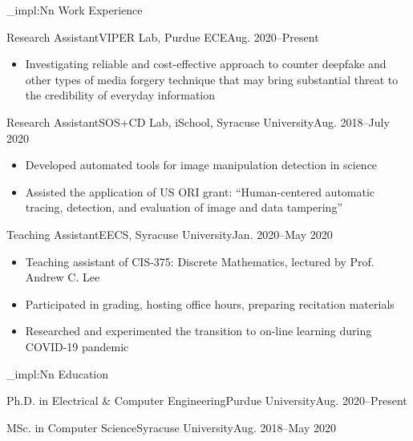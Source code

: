 \documentclass[11pt]{article}
\newcommand{\cvhead}[1]{\cvhead_impl:Nn \Large {#1}}
\begin{document}
{
\color{c-text-primary}
\begin{minipage}[t]{0.48\linewidth}
\cvhead{Work Experience}
\begin{triplehead}{Research Assistant}{VIPER Lab, Purdue ECE}{Aug. 2020--Present}
\begin{itemize}
\item Investigating reliable and cost-effective approach to counter deepfake and other types of media forgery technique that may bring substantial threat to the credibility of everyday information
\end{itemize}
\end{triplehead}

\begin{triplehead}{Research Assistant}{SOS+CD Lab, iSchool, Syracuse University}{Aug. 2018--July 2020}
\begin{itemize}
\item Developed automated tools for image manipulation detection in science
\item Assisted the application of US ORI grant: “Human-centered automatic tracing, detection, and evaluation of image and data tampering”
\end{itemize}
\end{triplehead}

\begin{triplehead}{Teaching Assistant}{EECS, Syracuse University}{Jan. 2020--May 2020}
\begin{itemize}
\item Teaching assistant of CIS-375: Discrete Mathematics, lectured by Prof. Andrew C. Lee
\item Participated in grading, hosting office hours, preparing recitation materials
\item Researched and experimented the transition to on-line learning during COVID-19 pandemic
\end{itemize}
\end{triplehead}

\cvhead{Education}

\begin{triplehead}{Ph.D. in Electrical \& Computer Engineering}{Purdue University}{Aug. 2020--Present}
\end{triplehead}

\begin{triplehead}{MSc. in Computer Science}{Syracuse University}{Aug. 2018--May 2020}
\end{triplehead}


\end{minipage}}
\end{document}
